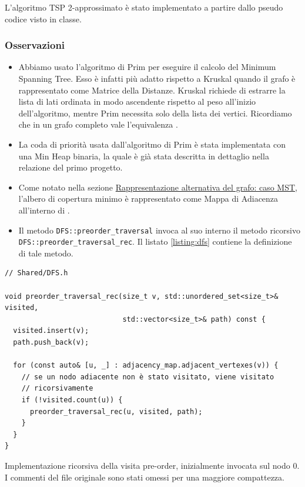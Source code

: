 \noindent L'algoritmo TSP 2-approssimato è stato implementato a partire dallo pseudo codice visto in classe. \\

\subsubsection{Osservazioni}

\begin{itemize}
    \item Abbiamo usato l'algoritmo di Prim per eseguire il calcolo del Minimum Spanning Tree. Esso è infatti più adatto rispetto a Kruskal quando il grafo è rappresentato come Matrice della Distanze. Kruskal richiede di estrarre la lista di lati ordinata in modo ascendente rispetto al peso all'inizio dell'algoritmo, mentre Prim necessita solo della lista dei vertici. Ricordiamo che in un grafo completo vale l'equivalenza \complexityCompleteGraph{}.

    \item La coda di priorità usata dall'algoritmo di Prim è stata implementata con una Min Heap binaria, la quale è già stata descritta in dettaglio nella relazione del primo progetto.

    \item Come notato nella sezione \hyperref[alternative-graph-representation]{Rappresentazione alternativa del grafo: caso MST}, l'albero di copertura minimo è rappresentato come Mappa di Adiacenza all'interno di .

    \item Il metodo \texttt{DFS::preorder_traversal} invoca al suo interno il metodo ricorsivo \\
    \texttt{DFS::preorder_traversal_rec}. Il listato \ref{listing:dfs} contiene la definizione di tale metodo.
\end{itemize}

\begin{listing}[!ht]
\begin{verbatim}
// Shared/DFS.h

void preorder_traversal_rec(size_t v, std::unordered_set<size_t>& visited,
                            std::vector<size_t>& path) const {
  visited.insert(v);
  path.push_back(v);

  for (const auto& [u, _] : adjacency_map.adjacent_vertexes(v)) {
    // se un nodo adiacente non è stato visitato, viene visitato
    // ricorsivamente
    if (!visited.count(u)) {
      preorder_traversal_rec(u, visited, path);
    }
  }
}
\end{verbatim}
\caption{Implementazione ricorsiva della visita pre-order, inizialmente invocata sul nodo $0$. I commenti del file originale sono stati omessi per una maggiore compattezza.}
\label{listing:dfs}
\end{listing}

